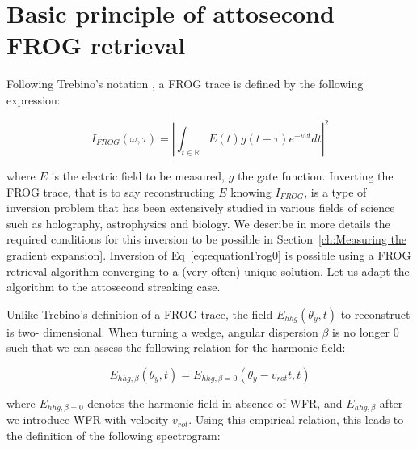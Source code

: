 %
%





\section{Basic principle of attosecond FROG retrieval}

Following Trebino's notation \cite{Trebino1993}, a FROG trace is defined by the following expression:

\begin{equation}
\label{eq:equationFrog0}
I_{FROG}(\omega,\tau) = |\int_{t\in \mathbb{R}}E(t)g(t-\tau)e^{-i\omega t}dt|^2
\end{equation}

\noindent where $E$ is the electric field to be measured, $g$ the gate function. Inverting the FROG trace, that is to say reconstructing $E$ knowing $I_{FROG}$, is a type of inversion problem that has been extensively studied in various fields of science such as holography, astrophysics and biology. We describe in more details the required conditions for this inversion to be possible in Section~\ref{ch:Measuring the gradient expansion}. Inversion of Eq~\ref{eq:equationFrog0} is possible using a FROG retrieval algorithm converging to a (very often) unique solution. Let us adapt the algorithm to the attosecond streaking case. \\

\noindent {}

\noindent Unlike Trebino's definition of a FROG trace, the field $E_{hhg}(\theta_y,t)$ to reconstruct is two- dimensional. When turning a wedge, angular dispersion $\beta$ is no longer $0$ such that we can assess the following relation for the harmonic field:

$$
E_{hhg,\beta}(\theta_y,t)= E_{hhg,\beta=0}(\theta_y-v_{rot} t,t)
$$

\noindent where $E_{hhg,\beta=0}$ denotes the harmonic field in absence of WFR, and $E_{hhg,\beta}$ after we introduce WFR with velocity $v_{rot}$. Using this empirical relation, this leads to the definition of the following spectrogram:

